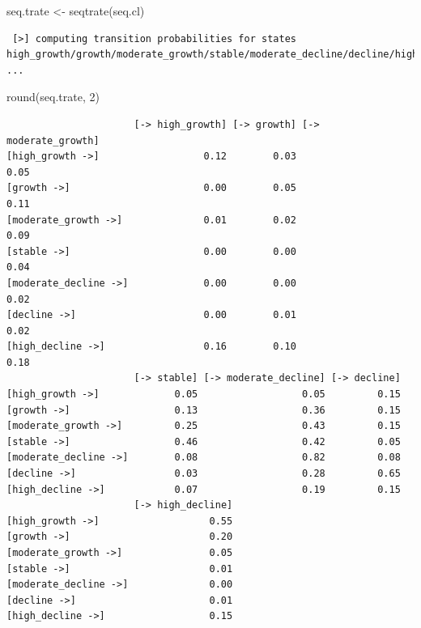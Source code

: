 \documentclass[
  letterpaper,
  DIV=11,
  numbers=noendperiod]{scrreprt}
\newenvironment{Shaded}{\begin{snugshade}}{\end{snugshade}}
\newcommand{\DecValTok}[1]{\textcolor[rgb]{0.68,0.00,0.00}{#1}}
\newcommand{\FunctionTok}[1]{\textcolor[rgb]{0.28,0.35,0.67}{#1}}
\newcommand{\NormalTok}[1]{\textcolor[rgb]{0.00,0.23,0.31}{#1}}
\newcommand{\OtherTok}[1]{\textcolor[rgb]{0.00,0.23,0.31}{#1}}
\begin{document}
\begin{Shaded}
\begin{Highlighting}[]
\NormalTok{seq.trate }\OtherTok{\textless{}{-}} \FunctionTok{seqtrate}\NormalTok{(seq.cl)}
\end{Highlighting}
\end{Shaded}

\begin{verbatim}
 [>] computing transition probabilities for states high_growth/growth/moderate_growth/stable/moderate_decline/decline/high_decline ...
\end{verbatim}

\begin{Shaded}
\begin{Highlighting}[]
\FunctionTok{round}\NormalTok{(seq.trate, }\DecValTok{2}\NormalTok{)}
\end{Highlighting}
\end{Shaded}

\begin{verbatim}
                      [-> high_growth] [-> growth] [-> moderate_growth]
[high_growth ->]                  0.12        0.03                 0.05
[growth ->]                       0.00        0.05                 0.11
[moderate_growth ->]              0.01        0.02                 0.09
[stable ->]                       0.00        0.00                 0.04
[moderate_decline ->]             0.00        0.00                 0.02
[decline ->]                      0.00        0.01                 0.02
[high_decline ->]                 0.16        0.10                 0.18
                      [-> stable] [-> moderate_decline] [-> decline]
[high_growth ->]             0.05                  0.05         0.15
[growth ->]                  0.13                  0.36         0.15
[moderate_growth ->]         0.25                  0.43         0.15
[stable ->]                  0.46                  0.42         0.05
[moderate_decline ->]        0.08                  0.82         0.08
[decline ->]                 0.03                  0.28         0.65
[high_decline ->]            0.07                  0.19         0.15
                      [-> high_decline]
[high_growth ->]                   0.55
[growth ->]                        0.20
[moderate_growth ->]               0.05
[stable ->]                        0.01
[moderate_decline ->]              0.00
[decline ->]                       0.01
[high_decline ->]                  0.15
\end{verbatim}
\end{document}
